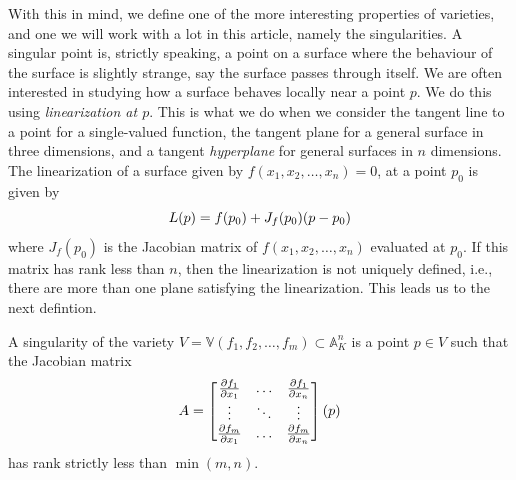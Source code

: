 \documentclass{article}
\newcommand{\A}{\ensuremath{\mathbb{A}}}
\newcommand{\V}{\ensuremath{\mathbb{V}}}
\begin{document}
    With this in mind, we define one of the more interesting properties of
    varieties, and one we will work with a lot in this article, namely the
    singularities. A singular point is, strictly speaking, a point on a surface
    where the behaviour of the surface is slightly strange, say the surface
    passes through itself. We are often interested in studying how a surface
    behaves locally near a point $p$. We do this using \emph{linearization at
    $p$}. This is what we do when we consider the tangent line to a point for a
    single-valued function, the tangent plane for a general surface in three
    dimensions, and a tangent \emph{hyperplane} for general surfaces in $n$
    dimensions. The linearization of a surface given by $f(x_1, x_2, \ldots,
    x_n) = 0$, at a point $p_0$ is given by
    \begin{equation}
        \notag
        L(p) = f(p_0) + J_f(p_0)(p - p_0)
    \end{equation}
    where $J_f(p_0)$ is the Jacobian matrix of $f(x_1, x_2, \ldots, x_n)$
    evaluated at $p_0$. If this matrix has rank less than $n$, then the
    linearization is not uniquely defined, i.e., there are more than one plane
    satisfying the linearization. This leads us to the next defintion.
    
    \begin{definition}
        A singularity of the variety $V = \V(f_1, f_2, \ldots, f_m) \subset
        \A_K^n$ is a point $p \in V$ such that the Jacobian matrix
        \begin{equation}
            \notag
            A = \begin{bmatrix}
                \frac{\partial f_1}{\partial x_1} & \hdots & \frac{\partial f_1}{\partial x_n} \\
                \vdots & \ddots & \vdots \\
                \frac{\partial f_m}{\partial x_1} & \hdots & \frac{\partial f_m}{\partial x_n}
            \end{bmatrix}(p)
        \end{equation}
        has rank strictly less than $\min(m, n)$.
    \end{definition}
\end{document}
